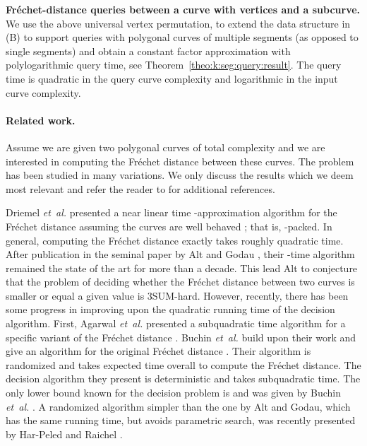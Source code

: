 \documentclass[12pt]{article}
\newcommand{\thmref}[1]{Theorem~\ref{theo:#1}}
\newcommand{\etal}{\textit{et~al.}\xspace}
\newcommand{\Frechet}{Fr\'{e}c{h}e{}t\xspace}\providecommand{\Arr}{\mathop{\mathrm{\EuScript{A}}}}
\numberwithin{figure}{section}
\numberwithin{equation}{section}
\begin{document}
\begin{compactenum}[(A)]
    \item \textbf{\Frechet-distance queries between a curve with 
       vertices and a subcurve.}  We use the above universal vertex
    permutation, to extend the data structure in (B) to support
    queries with polygonal curves of multiple segments (as opposed to
    single segments) and obtain a constant factor approximation with
    polylogarithmic query time, see \thmref{k:seg:query:result}. The
    query time is quadratic in the query curve complexity and
    logarithmic in the input curve complexity.
    
\end{compactenum}


\paragraph{Related work.}Assume we are given two polygonal curves of total complexity  and
we are interested in computing the \Frechet distance between these
curves. The problem has been studied in many variations.  We only
discuss the results which we deem most relevant and refer the reader
to \cite{bbmm-fswd-12} for additional references.

Driemel \etal presented a near linear time -approximation
algorithm for the \Frechet distance assuming the curves are well
behaved \cite{dhw-afdrc-12}; that is, -packed.  In general,
computing the \Frechet distance exactly takes roughly quadratic time.
After publication in the seminal paper by Alt and Godau
\cite{ag-cfdbt-95}, their -time algorithm remained the
state of the art for more than a decade.  This lead Alt to conjecture
that the problem of deciding whether the \Frechet distance between two
curves is smaller or equal a given value is 3SUM-hard.  However,
recently, there has been some progress in improving upon the quadratic
running time of the decision algorithm.  First, Agarwal \etal
presented a subquadratic time algorithm for a specific variant of the
\Frechet distance \cite{aaks-dfst-13}.  Buchin \etal build upon their
work and give an algorithm for the original \Frechet distance
\cite{bbmm-fswd-12}.  Their algorithm is randomized and takes  expected time overall to compute the \Frechet
distance. The decision algorithm they present is deterministic and
takes subquadratic time.  The only lower bound known for the decision
problem is  and was given by Buchin \etal
\cite{bbkrw-wtd-07}.  A randomized algorithm simpler than the one by
Alt and Godau, which has the same running time, but avoids parametric
search, was recently presented by Har-Peled and Raichel
\cite{hr-fdre-13}.
\end{document}
